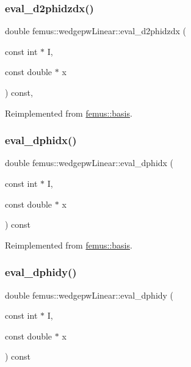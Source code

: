 \subsubsection{\texorpdfstring{eval\+\_\+d2phidzdx()}{eval\_d2phidzdx()}}
{\footnotesize\ttfamily double femus\+::wedgepw\+Linear\+::eval\+\_\+d2phidzdx (\begin{DoxyParamCaption}\item[{const int $\ast$}]{I,  }\item[{const double $\ast$}]{x }\end{DoxyParamCaption}) const\hspace{0.3cm}{\ttfamily [inline]}, {\ttfamily [virtual]}}



Reimplemented from \mbox{\hyperlink{classfemus_1_1basis_a5d619ec5bd57b7d2dc34a99d69975c77}{femus\+::basis}}.

\mbox{\label{classfemus_1_1wedgepw_linear_aa8a29e0df55ce4ac28f0f6c3dde95bb8}} 
\subsubsection{\texorpdfstring{eval\+\_\+dphidx()}{eval\_dphidx()}}
{\footnotesize\ttfamily double femus\+::wedgepw\+Linear\+::eval\+\_\+dphidx (\begin{DoxyParamCaption}\item[{const int $\ast$}]{I,  }\item[{const double $\ast$}]{x }\end{DoxyParamCaption}) const\hspace{0.3cm}{\ttfamily [virtual]}}



Reimplemented from \mbox{\hyperlink{classfemus_1_1basis_a4db7d29cf8a753ddbccc4a297dafa0bf}{femus\+::basis}}.

\mbox{\label{classfemus_1_1wedgepw_linear_ad125cd826158dcdd9f8f3d215ef3fc24}} 
\subsubsection{\texorpdfstring{eval\+\_\+dphidy()}{eval\_dphidy()}}
{\footnotesize\ttfamily double femus\+::wedgepw\+Linear\+::eval\+\_\+dphidy (\begin{DoxyParamCaption}\item[{const int $\ast$}]{I,  }\item[{const double $\ast$}]{x }\end{DoxyParamCaption}) const\hspace{0.3cm}{\ttfamily [virtual]}}



